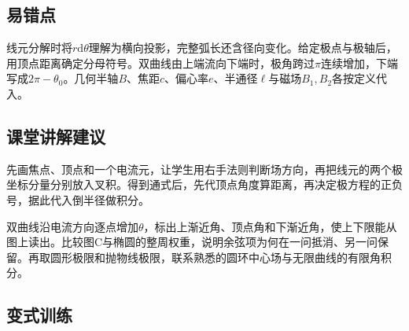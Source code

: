 \documentclass[UTF8,fontset=fandol,a4paper,11pt]{ctexart}
\begin{document}


\subsection*{易错点}

线元分解时将$r\mathrm d\theta$理解为横向投影，完整弧长还含径向变化。给定极点与极轴后，用顶点距离确定分母符号。双曲线由上端流向下端时，极角跨过$\pi$连续增加，下端写成$2\pi-\theta_0$。几何半轴$B$、焦距$c$、偏心率$e$、半通径$\ell$与磁场$B_1,B_2$各按定义代入。



\subsection*{课堂讲解建议}

先画焦点、顶点和一个电流元，让学生用右手法则判断场方向，再把线元的两个极坐标分量分别放入叉积。得到通式后，先代顶点角度算距离，再决定极方程的正负号，据此代入倒半径做积分。

双曲线沿电流方向逐点增加$\theta$，标出上渐近角、顶点角和下渐近角，使上下限能从图上读出。比较图C与椭圆的整周权重，说明余弦项为何在一问抵消、另一问保留。再取圆形极限和抛物线极限，联系熟悉的圆环中心场与无限曲线的有限角积分。



\subsection*{变式训练}
\end{document}

